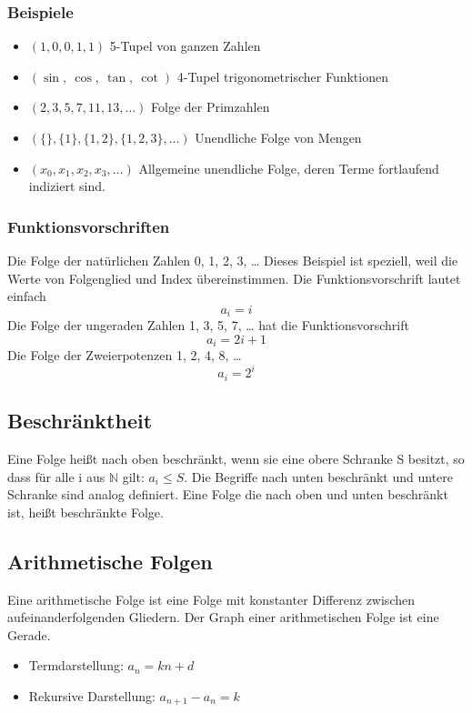 \documentclass[a4paper]{article}
\begin{document}
\subsubsection{Beispiele}
\begin{itemize}
\item $(1, 0, 0, 1, 1)$ 5-Tupel von ganzen Zahlen
\item $(\sin,\ \cos,\ \tan,\ \cot)$ 4-Tupel trigonometrischer Funktionen
\item $(2, 3, 5, 7, 11, 13, \dotsc)$ Folge der Primzahlen
\item $(\{\}, \{1\}, \{1,2\}, \{1,2,3\}, \dotsc)$ Unendliche Folge von Mengen
\item $(x_0, x_1, x_2, x_3, \dotsc)$ Allgemeine unendliche Folge, deren Terme fortlaufend indiziert sind.
\end{itemize}

\subsubsection{Funktionsvorschriften}
Die Folge der natürlichen Zahlen 0, 1, 2, 3, … Dieses Beispiel ist speziell, weil die Werte von Folgenglied und Index übereinstimmen. Die Funktionsvorschrift lautet einfach
\[ a_i = i \]
Die Folge der ungeraden Zahlen 1, 3, 5, 7, … hat die Funktionsvorschrift
\[ a_i = 2i+1\]
Die Folge der Zweierpotenzen 1, 2, 4, 8, …
\[ a_i = 2^i \]

\subsection{Beschränktheit}
Eine Folge heißt nach oben beschränkt, wenn sie eine obere Schranke S besitzt, so dass für alle i aus $\mathbb{N}$ gilt: $a_i \leq S$.  Die Begriffe nach unten beschränkt und untere Schranke sind analog definiert. Eine Folge die nach oben und unten beschränkt ist, heißt beschränkte Folge.

\subsection{Arithmetische Folgen}
Eine arithmetische Folge ist eine Folge mit konstanter Differenz zwischen aufeinanderfolgenden Gliedern. Der Graph einer arithmetischen Folge ist eine Gerade.
\begin{itemize}
\item Termdarstellung: $a_n=kn + d$
\item Rekursive Darstellung: $a_{n+1}-a_n = k$
\end{itemize}
\end{document}
